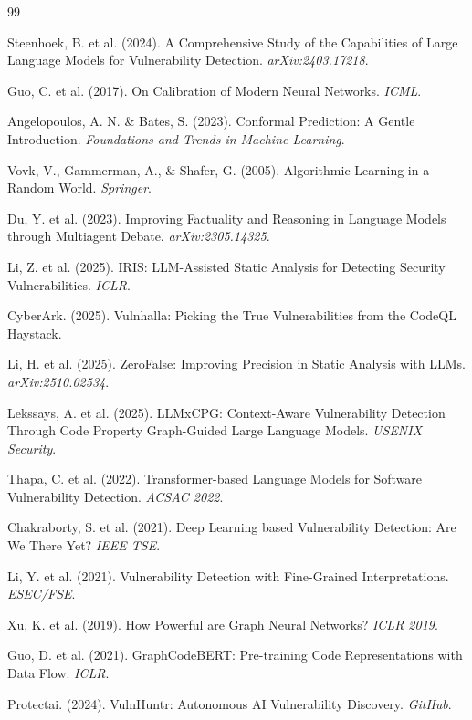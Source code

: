 \documentclass[a4paper, 12pt]{extreport}
\begin{document}
\begin{thebibliography}{99}
{ Steenhoek, B. et al. (2024). A Comprehensive Study of the Capabilities of Large Language Models for Vulnerability Detection. \textit{arXiv:2403.17218}.

 Guo, C. et al. (2017). On Calibration of Modern Neural Networks. \textit{ICML}.

 Angelopoulos, A. N. \& Bates, S. (2023). Conformal Prediction: A Gentle Introduction. \textit{Foundations and Trends in Machine Learning}.

 Vovk, V., Gammerman, A., \& Shafer, G. (2005). Algorithmic Learning in a Random World. \textit{Springer}.

 Du, Y. et al. (2023). Improving Factuality and Reasoning in Language Models through Multiagent Debate. \textit{arXiv:2305.14325}.

 Li, Z. et al. (2025). IRIS: LLM-Assisted Static Analysis for Detecting Security Vulnerabilities. \textit{ICLR}.

 CyberArk. (2025). Vulnhalla: Picking the True Vulnerabilities from the CodeQL Haystack.

 Li, H. et al. (2025). ZeroFalse: Improving Precision in Static Analysis with LLMs. \textit{arXiv:2510.02534}.

 Lekssays, A. et al. (2025). LLMxCPG: Context-Aware Vulnerability Detection Through Code Property Graph-Guided Large Language Models. \textit{USENIX Security}.

 Thapa, C. et al. (2022). Transformer-based Language Models for Software Vulnerability Detection. \textit{ACSAC 2022}.

 Chakraborty, S. et al. (2021). Deep Learning based Vulnerability Detection: Are We There Yet? \textit{IEEE TSE}.

 Li, Y. et al. (2021). Vulnerability Detection with Fine-Grained Interpretations. \textit{ESEC/FSE}.

 Xu, K. et al. (2019). How Powerful are Graph Neural Networks? \textit{ICLR 2019}.

 Guo, D. et al. (2021). GraphCodeBERT: Pre-training Code Representations with Data Flow. \textit{ICLR}.

 Protectai. (2024). VulnHuntr: Autonomous AI Vulnerability Discovery. \textit{GitHub}.

}
\end{thebibliography}
\end{document}
